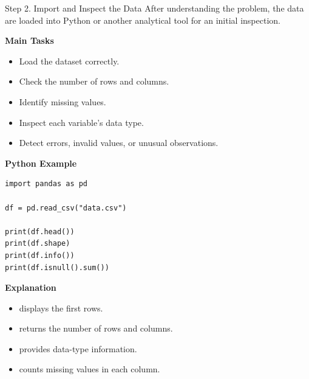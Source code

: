 \documentclass[aspectratio=169,11pt]{beamer}
\begin{document}
\begin{frame}{Step 2. Import and Inspect the Data}
\footnotesize
After understanding the problem, the data are loaded into Python or another analytical tool for an initial inspection.\par\medskip
\textbf{Main Tasks}\par\medskip
\begin{itemize}
\item Load the dataset correctly.
\item Check the number of rows and columns.
\item Identify missing values.
\item Inspect each variable's data type.
\item Detect errors, invalid values, or unusual observations.
\end{itemize}
\textbf{Python Example}\par\medskip
\begin{lstlisting}[style=py]
import pandas as pd

df = pd.read_csv("data.csv")

print(df.head())
print(df.shape)
print(df.info())
print(df.isnull().sum())
\end{lstlisting}
\textbf{Explanation}\par\medskip
\begin{itemize}
\item \texttt{} displays the first rows.
\item \texttt{} returns the number of rows and columns.
\item \texttt{} provides data-type information.
\item \texttt{} counts missing values in each column.
\end{itemize}
\end{frame}
\end{document}
